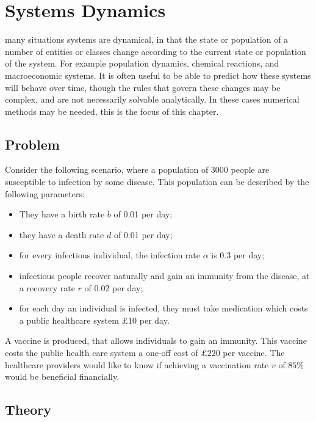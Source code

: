 \chapter[Systems dynamics]{Systems Dynamics}\label{chp:system_dynamics}

 many situations systems are dynamical, in that the state
or population of a number of entities or classes change according to the current
state or population of the system. For example population dynamics, chemical
reactions, and macroeconomic systems. It is often useful to be able to
predict how these systems will behave over time, though the rules that govern
these changes may be complex, and are not necessarily solvable analytically. In
these cases numerical methods may be needed, this is the focus
of this chapter.

\section{Problem}\label{sec:system_dynamics_problem}

Consider the following scenario, where a population of 3000 people are
susceptible to infection by some disease. This population can be described by
the following parameters:

\begin{itemize}
  \item They have a birth rate $b$ of 0.01 per day;
  \item they have a death rate $d$ of 0.01 per day;
  \item for every infectious individual, the infection rate $\alpha$ is 0.3 per
  day;
  \item infectious people recover naturally and gain an immunity from the
  disease, at a recovery rate $r$ of 0.02 per day;
  \item for each day an individual is infected, they must take medication which
  costs a public healthcare system $\pounds 10$ per day.
\end{itemize}

A vaccine is produced, that allows individuals to gain an immunity.
This vaccine costs the public health care system a one-off cost of
$\pounds 220$ per vaccine. The healthcare providers would like
to know if achieving a vaccination rate $v$ of $85\%$ would be beneficial
financially.

\section{Theory}\label{sec:system_dynamics_theory}

